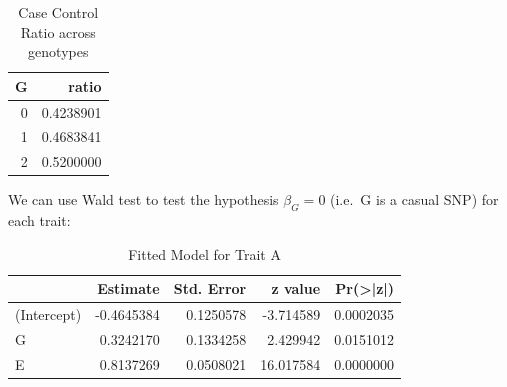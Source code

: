 \documentclass[
]{article}
\newenvironment{Shaded}{\begin{snugshade}}{\end{snugshade}}
\newcommand{\AttributeTok}[1]{\textcolor[rgb]{0.77,0.63,0.00}{#1}}
\newcommand{\DecValTok}[1]{\textcolor[rgb]{0.00,0.00,0.81}{#1}}
\newcommand{\DocumentationTok}[1]{\textcolor[rgb]{0.56,0.35,0.01}{\textbf{\textit{#1}}}}
\newcommand{\FunctionTok}[1]{\textcolor[rgb]{0.00,0.00,0.00}{#1}}
\newcommand{\NormalTok}[1]{#1}
\newcommand{\OtherTok}[1]{\textcolor[rgb]{0.56,0.35,0.01}{#1}}
\newcommand{\SpecialCharTok}[1]{\textcolor[rgb]{0.00,0.00,0.00}{#1}}
\newcommand{\StringTok}[1]{\textcolor[rgb]{0.31,0.60,0.02}{#1}}
\begin{document}
\begin{table}[H]

\caption{\label{tab:simulatedData}Case Control Ratio across genotypes}
\centering
\fontsize{10}{12}\selectfont
\begin{tabular}[t]{r|r}
\hline
G & ratio\\
\hline
0 & 0.4238901\\
\hline
1 & 0.4683841\\
\hline
2 & 0.5200000\\
\hline
\end{tabular}
\end{table}

We can use Wald test to test the hypothesis \(\beta_G = 0\) (i.e.~G is a
casual SNP) for each trait:

\begin{Shaded}
\end{Shaded}

\begin{table}[H]

\caption{\label{tab:unnamed-chunk-1}Fitted Model for Trait A}
\centering
\fontsize{10}{12}\selectfont
\begin{tabular}[t]{l|r|r|r|r}
\hline
  & Estimate & Std. Error & z value & Pr(>|z|)\\
\hline
(Intercept) & -0.4645384 & 0.1250578 & -3.714589 & 0.0002035\\
\hline
G & 0.3242170 & 0.1334258 & 2.429942 & 0.0151012\\
\hline
E & 0.8137269 & 0.0508021 & 16.017584 & 0.0000000\\
\hline
\end{tabular}
\end{table}
\end{document}
